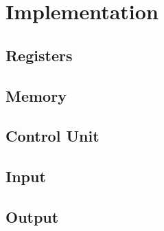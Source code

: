 \section{Implementation} \label{sec:implementation}
\subsection{Registers}
\subsection{Memory}
\subsection{Control Unit}
\subsection{Input}
\subsection{Output}


